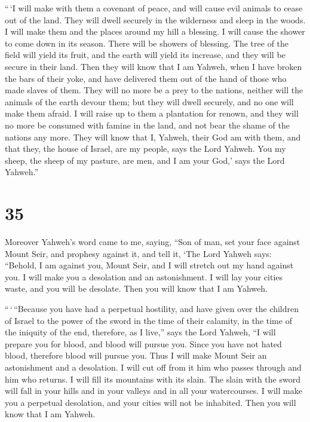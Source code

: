  ``\,`I will make with them a covenant of peace, and will
cause evil animals to cease out of the land. They will dwell securely in
the wilderness and sleep in the woods.  I will make them
and the places around my hill a blessing. I will cause the shower to
come down in its season. There will be showers of blessing.
 The tree of the field will yield its fruit, and the
earth will yield its increase, and they will be secure in their land.
Then they will know that I am Yahweh, when I have broken the bars of
their yoke, and have delivered them out of the hand of those who made
slaves of them.  They will no more be a prey to the
nations, neither will the animals of the earth devour them; but they
will dwell securely, and no one will make them afraid.  I
will raise up to them a plantation for renown, and they will no more be
consumed with famine in the land, and not bear the shame of the nations
any more.  They will know that I, Yahweh, their God am
with them, and that they, the house of Israel, are my people, says the
Lord Yahweh.  You my sheep, the sheep of my pasture, are
men, and I am your God,' says the Lord Yahweh.''

\hypertarget{section-34}{%
\section{35}\label{section-34}}

 Moreover Yahweh's word came to me, saying, 
``Son of man, set your face against Mount Seir, and prophesy against it,
 and tell it, `The Lord Yahweh says: ``Behold, I am
against you, Mount Seir, and I will stretch out my hand against you. I
will make you a desolation and an astonishment.  I will
lay your cities waste, and you will be desolate. Then you will know that
I am Yahweh.

 ``\,`\,``Because you have had a perpetual hostility, and
have given over the children of Israel to the power of the sword in the
time of their calamity, in the time of the iniquity of the end,
 therefore, as I live,'' says the Lord Yahweh, ``I will
prepare you for blood, and blood will pursue you. Since you have not
hated blood, therefore blood will pursue you.  Thus I will
make Mount Seir an astonishment and a desolation. I will cut off from it
him who passes through and him who returns.  I will fill
its mountains with its slain. The slain with the sword will fall in your
hills and in your valleys and in all your watercourses.  I
will make you a perpetual desolation, and your cities will not be
inhabited. Then you will know that I am Yahweh.

